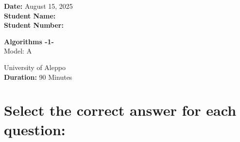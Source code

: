 \documentclass[12pt]{article}
\begin{document}
\begin{minipage}[t]{0.3\textwidth}
    \textbf{Date:} August 15, 2025\\[0.5em]
    \textbf{Student Name: }\\[0.5em]
    \textbf{Student Number: }
\end{minipage}
\begin{minipage}[t]{0.3\textwidth}
    \centering
    \Large\textbf{Algorithms -1-}\\[0.5em]
    \Large{Model:} A\\[0.5em]
\end{minipage}\hfill
\begin{minipage}[t]{0.3\textwidth}
    \raggedleft
    University of Aleppo\\[0.5em]
    \textbf{Duration: }90 Minutes

\end{minipage}

\vspace{1.5cm}

\section*{\small Select the correct answer for each question:}
\end{document}
